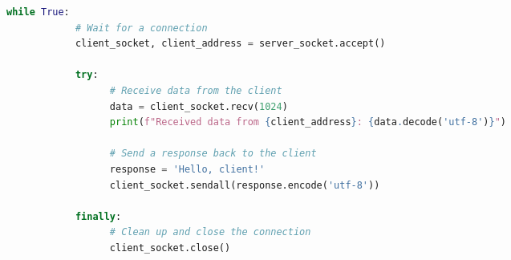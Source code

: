 \begin{multicols}{2}
\begin{lstlisting}[language=Python, caption=TCP Server Example Using Sockets in Python]
      while True:
            # Wait for a connection
            client_socket, client_address = server_socket.accept()

            try:
                  # Receive data from the client
                  data = client_socket.recv(1024)
                  print(f"Received data from {client_address}: {data.decode('utf-8')}")

                  # Send a response back to the client
                  response = 'Hello, client!'
                  client_socket.sendall(response.encode('utf-8'))

            finally:
                  # Clean up and close the connection
                  client_socket.close()
\end{lstlisting}


\end{multicols}
